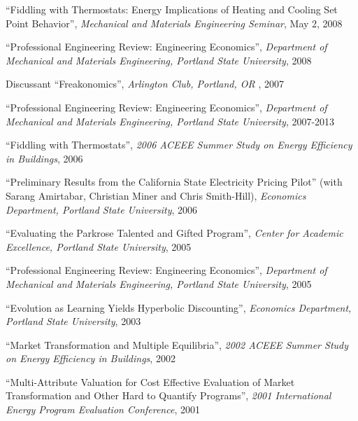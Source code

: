 \documentclass[Computer Science]{vita}
\begin{document}
\begin{vita}
\begin{Presentations and Invited Talks}
  \item ``Fiddling with Thermostats: Energy Implications of Heating
    and Cooling Set Point Behavior'', \emph{Mechanical and Materials
      Engineering Seminar}, May 2, 2008

  \item ``Professional Engineering Review: Engineering Economics'',
    \emph{Department of Mechanical and Materials Engineering, Portland
      State University}, 2008
  
  \item Discussant ``Freakonomics'', \emph{Arlington Club, Portland,
      OR }, 2007

  \item ``Professional Engineering Review: Engineering Economics'',
    \emph{Department of Mechanical and Materials Engineering, Portland
      State University}, 2007-2013

  \item ``Fiddling with Thermostats'', \emph{2006 ACEEE Summer Study
      on Energy Efficiency in Buildings}, 2006

  \item ``Preliminary Results from the California State Electricity
    Pricing Pilot'' (with Sarang Amirtabar, Christian Miner and Chris
    Smith-Hill), \emph{Economics Department, Portland State
      University}, 2006

  \item ``Evaluating the Parkrose Talented and Gifted Program'',
    \emph{Center for Academic Excellence, Portland State University},
    2005

  \item ``Professional Engineering Review: Engineering Economics'',
    \emph{Department of Mechanical and Materials Engineering, Portland
      State University}, 2005
	
  \item ``Evolution as Learning Yields Hyperbolic Discounting'',
    \emph{Economics Department, Portland State University}, 2003

  \item ``Market Transformation and Multiple Equilibria'', \emph{2002
      ACEEE Summer Study on Energy Efficiency in Buildings}, 2002
	
  \item ``Multi-Attribute Valuation for Cost Effective Evaluation of
    Market Transformation and Other Hard to Quantify Programs'',
    \emph{2001 International Energy Program Evaluation Conference},
    2001
	

\end{Presentations and Invited Talks}
\end{vita}
\end{document}
